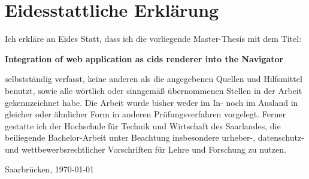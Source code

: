 \chapter*{Eidesstattliche Erklärung}

Ich erkläre an Eides Statt, dass ich die vorliegende Master-Thesis mit dem Titel:

\hspace{1.0cm}

{  \bfseries Integration of web application as cids renderer into the Navigator }

\hspace{1.0cm}

selbstständig verfasst, keine anderen als die angegebenen Quellen und Hilfsmittel
benutzt, sowie alle wörtlich oder sinngemäß übernommenen Stellen in der Arbeit
gekennzeichnet habe. Die Arbeit wurde bisher weder im In- noch im Ausland in
gleicher oder ähnlicher Form in anderen Prüfungsverfahren vorgelegt. Ferner gestatte
ich der Hochschule für Technik und Wirtschaft des Saarlandes, die beiliegende
Bachelor-Arbeit unter Beachtung insbesondere urheber-, datenschutz- und
wettbewerbsrechtlicher Vorschriften für Lehre und Forschung zu nutzen.


\vfill

{\large Saarbrücken, { \today}}

